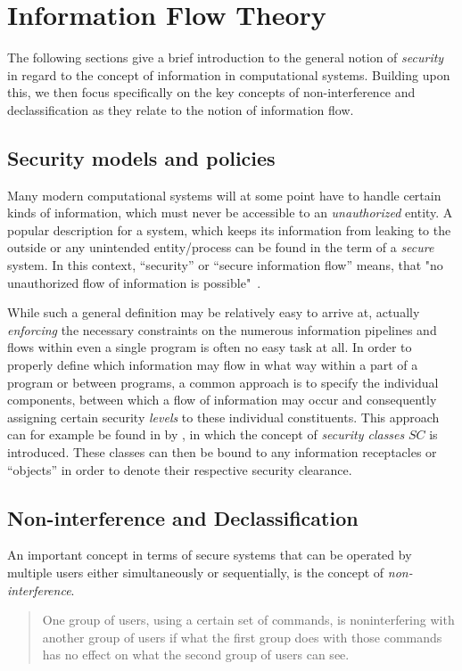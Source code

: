 
\section{Information Flow Theory} 
The following sections give a brief introduction to the general notion of \emph{security} in regard to the concept of information in computational systems.
Building upon this, we then focus specifically on the key concepts of non-interference and declassification as they relate to the notion of information flow.
\subsection{Security models and policies}
Many modern computational systems will at some point have to handle certain kinds of information, which must never be accessible to an \emph{unauthorized} entity.
A popular description for a system, which keeps its information from leaking to the outside or any unintended entity/process can be found in the term of a  \emph{secure} system.
In this context, ``security'' or ``secure information flow'' means, that "no unauthorized flow of information is possible"~\cite{lattice_model_security}.

While such a general definition may be relatively easy to arrive at, actually \emph{enforcing} the necessary constraints on the numerous information pipelines and flows within even a single program is often no easy task at all. 
In order to properly define which information may flow in what way within a part of a program or between programs, a common approach is to specify the individual components, between which a flow of information may occur and consequently assigning certain security \emph{levels} to these individual constituents. This approach can for example be found in \cite{lattice_model_security} by \citeauthor{lattice_model_security}, in which the concept of \emph{security classes} \(SC\) is introduced. These classes can then be bound to any information receptacles or ``objects'' in order to denote their respective security clearance.

\subsection{Non-interference and Declassification}
\label{ref:Declass_and_Inter}
An important concept in terms of secure systems that can be operated by multiple users either simultaneously or sequentially, is the concept of \emph{non-interference}.
\begin{quotation}
    One group of users, using a certain set of commands, is noninterfering with another group of users if what the first group does with those commands has no effect on what the second group of users can see.
\end{quotation}

